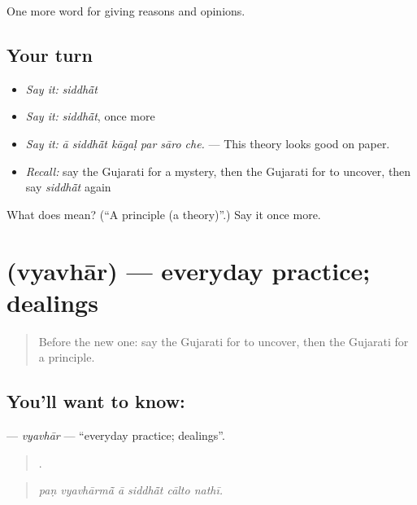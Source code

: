\begin{grammarlens}[title={What you've built}]
One more word for giving reasons and opinions.
\end{grammarlens}

\subsection*{Your turn}
\begin{itemize}
\raggedright
  \item \emph{Say it:} \emph{siddhā̃t}
  \item \emph{Say it:} \emph{siddhā̃t}, once more
  \item \emph{Say it:} \emph{ā siddhā̃t kāgaḷ par sāro che.} — This theory looks good on paper.
  \item \emph{Recall:} say the Gujarati for a mystery, then the Gujarati for to uncover, then say \emph{siddhā̃t} again
\end{itemize}

\begin{tcolorbox}[breakable,colback=teal!4,colframe=teal!35!black,title={Before you move on}]
What does  mean? (\textquotedblleft{}A principle (a theory)\textquotedblright{}.) Say it once more.
\end{tcolorbox}
\section[\texorpdfstring{\gu{વ્યવહાર} (vyavhār)}{વ્યવહાર (vyavhār)}]{ (vyavhār) — everyday practice; dealings}

\label{lesson:GU-C365-vyavhar}



\begin{quote}
Before the new one: say the Gujarati for to uncover, then the Gujarati for a principle.
\end{quote}

\subsection*{You'll want to know: }
\textbf{} — \emph{vyavhār} — \textquotedblleft{}everyday practice; dealings\textquotedblright{}.

\begin{quote}
     .
\end{quote}

\begin{quote}
\emph{paṇ vyavhārmā̃ ā siddhā̃t cālto nathī.}
\end{quote}

